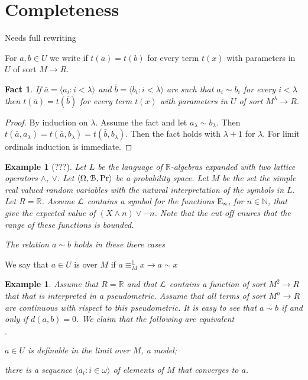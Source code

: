 \documentclass[11pt,oneside]{amsart}
\newcommand{\mylabel}[1]{{#1}\hfill}
\renewenvironment{itemize}
  {\begin{list}{$\cdot$}{%
   \setlength{\parskip}{0mm}
   \setlength{\topsep}{.2\baselineskip}
   \setlength{\rightmargin}{0mm}
   \setlength{\listparindent}{0mm}
   \setlength{\itemindent}{0mm}
   \setlength{\labelwidth}{3ex}
   \setlength{\itemsep}{.2\baselineskip}
   \setlength{\parsep}{.2\baselineskip}
   \setlength{\partopsep}{0mm}
   \setlength{\labelsep}{1ex}
   \setlength{\leftmargin}{\labelwidth+\labelsep}
   \let\makelabel\mylabel}}{%
   \end{list}}
\theoremstyle{plain}
\newtheorem{fact}[theorem]{Fact}
\newtheorem{example}[theorem]{Example}
\theoremstyle{remark}
\renewcommand*{\emph}[1]{%
   \smash{\tikz[baseline]\node[rectangle, fill=olive!25, rounded corners, inner xsep=0.5ex, inner ysep=0.2ex, anchor=base, minimum height = 2.7ex]{#1};}}
\begin{document}
\section{Completeness}

Needs full rewriting

For $a,b\in U$ we write \emph{$a\sim b$\/} if $t(a)=t(b)$ for every term $t(x)$ with parameters in $U$ of sort $M\to R$. 

\begin{fact}
  If $\bar a=\langle a_i:i<\lambda\rangle$ and $\bar b=\langle b_i:i<\lambda\rangle$ are such that $a_i\sim b_i$ for every $i<\lambda$ then $t(\bar a)=t(\bar b)$ for every term $t(x)$ with parameters in $U$ of sort $M^\lambda\to R$.
\end{fact}

\begin{proof}
  By induction on $\lambda$. Assume the fact and let $a_\lambda\sim b_\lambda$.
  Then $t(\bar a,a_\lambda)=t(\bar a,b_\lambda)=t(\bar b,b_\lambda)$.
  Then the fact holds with $\lambda+1$ for $\lambda$.
  For limit ordinals induction is immediate.
\end{proof}

\begin{example}[???]
  Let $L$ be the language of $\mathds{R}$-algebras expanded with two lattice operators $\wedge$, $\vee$.
  Let $\langle\Omega,{\EuScript B},\Pr\rangle$ be a probability space.
  Let $M$ be the set the simple real valued random variables with the natural interpretation of the symbols in $L$. 
  Let $R=\mathds{R}$.
  Assume ${\EuScript L}$ contains a symbol for the functions ${\rm E}_n$, for $n\in\mathds{N}$, that give the expected value of $(X\wedge n)\vee -n$.
  Note that the cut-off enures that the range of these functions is bounded.

  The relation $a\sim b$ holds in these there cases


\end{example}



We say that $a\in U$ is \emph{definable in the limit\/} over $M$ if $a\equiv^\mathds{L}_M x\rightarrow a\sim x$

\begin{example}
  Assume that $R=\mathds{R}$ and that ${\EuScript L}$ contains a function of sort $M^2\to R$ that that is interpreted in a pseudometric.
  Assume that all terms of sort $M^n\to R$ are continuous with rispect to this pseudometric.
  It is easy to see that $a\sim b$ if and only if $d(a,b)=0$.
  We claim that the following are equivalent
  \begin{itemize}
    \item[1.] $a\in U$ is definable in the limit over $M$, a model;
    \item[2.] there is a sequence $\langle a_i: i\in\omega\rangle$ of elements of $M$ that converges to $a$.
  \end{itemize} 
\end{example}
\end{document}
